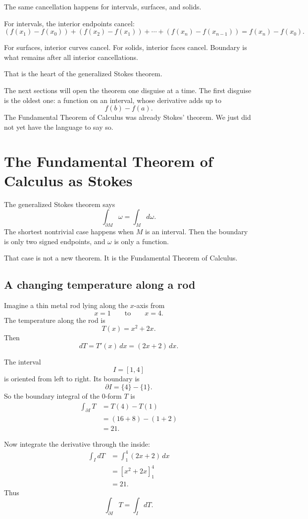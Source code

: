 The same cancellation happens for intervals, surfaces, and solids.

For intervals, the interior endpoints cancel:
\[
    (f(x_1)-f(x_0))+(f(x_2)-f(x_1))+\cdots+(f(x_n)-f(x_{n-1}))
    =
    f(x_n)-f(x_0).
\]

For surfaces, interior curves cancel.  For solids, interior faces cancel.  Boundary is
what remains after all interior cancellations.

That is the heart of the generalized Stokes theorem.

The next sections will open the theorem one disguise at a time.  The first disguise is
the oldest one: a function on an interval, whose derivative adds up to
\[
    f(b)-f(a).
\]
The Fundamental Theorem of Calculus was already Stokes' theorem.  We just did not yet
have the language to say so.
\section{The Fundamental Theorem of Calculus as Stokes}
\label{sec:18.3}

The generalized Stokes theorem says
\[
    \int_{\partial M}\omega=\int_M d\omega.
\]
The shortest nontrivial case happens when \(M\) is an interval.  Then the boundary is
only two signed endpoints, and \(\omega\) is only a function.

That case is not a new theorem.  It is the Fundamental Theorem of Calculus.

\subsection{A changing temperature along a rod}

Imagine a thin metal rod lying along the \(x\)-axis from
\[
    x=1
    \qquad\text{to}\qquad
    x=4.
\]
The temperature along the rod is
\[
    T(x)=x^2+2x.
\]
Then
\[
    dT=T'(x)\,dx=(2x+2)\,dx.
\]

The interval
\[
    I=[1,4]
\]
is oriented from left to right.  Its boundary is
\[
    \partial I=\{4\}-\{1\}.
\]
So the boundary integral of the \(0\)-form \(T\) is
\[
\begin{aligned}
    \int_{\partial I}T
    &=
    T(4)-T(1)\\
    &=
    (16+8)-(1+2)\\
    &=
    21.
\end{aligned}
\]

Now integrate the derivative through the inside:
\[
\begin{aligned}
    \int_I dT
    &=
    \int_1^4 (2x+2)\,dx\\
    &=
    \left[x^2+2x\right]_1^4\\
    &=
    21.
\end{aligned}
\]
Thus
\[
\boxed{
    \int_{\partial I}T=\int_I dT.
}
\]


